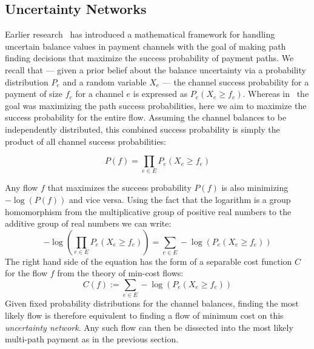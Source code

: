 \documentclass[10pt,twocolumn]{article}
\begin{document}
\subsection{Uncertainty Networks}
Earlier research~\cite{pickhardt2021security} has introduced a mathematical framework for handling uncertain balance values in payment channels with the goal of making path finding decisions that maximize the success probability of payment paths.
We recall that --- given a prior belief about the balance uncertainty via a probability distribution $P_e$ and a random variable $X_e$ ---  the channel success probability for a payment of size $f_e$ for a channel $e$ is expressed as $P_e(X_e\geq f_e)$.
Whereas in~\cite{pickhardt2021security} the goal was maximizing the path success probabilities, here we aim to maximize the success probability for the entire flow. Assuming the channel balances to be independently distributed, this combined success probability is simply the product of all channel success probabilities:

\[
P(f)=\prod_{e\in E}P_e\left(X_{e} \geq f_e\right)
\]

Any flow $f$ that maximizes the success probability $P(f)$ is also minimizing $-\log\left(P(f)\right)$ and vice versa.
Using the fact that the logarithm is a group homomorphism from the multiplicative group of positive real numbers to the additive group of real numbers we can write:
\[
-\log\left(\prod_{e\in E}P_e(X_{e} \geq f_e)\right) = \sum_{e\in E}-\log\left(P_e(X_e \geq f_e)\right)
\]
The right hand side of the equation has the form of a separable cost function $C$ for the flow $f$ from the theory of min-cost flows:
\[
C(f) := \sum_{e\in E}-\log\left(P_e(X_e \geq f_e)\right)
\]
Given fixed probability distributions for the channel balances, finding the most likely flow is therefore equivalent to finding a flow of minimum cost on this \emph{uncertainty network}. Any such flow can then be dissected into the most likely multi-path payment as in the previous section.
\end{document}
